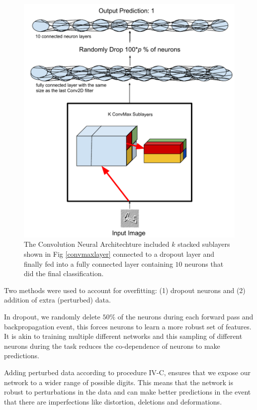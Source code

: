 \documentclass[conference]{IEEEtran}
\begin{document}
\begin{figure}[h]
	\includegraphics[scale=0.5]{architecture.pdf}
	\caption{The Convolution Neural Architechture included $k$ stacked sublayers shown in Fig \ref{convmaxlayer} connected to a dropout layer and finally fed into a fully connected layer containing $10$ neurons that did the final classification.}
	\label{CNNarch}
\end{figure}

Two methods were used to account for overfitting: (1) dropout\cite{dropout} neurons and (2) addition of extra (perturbed) data. 

In dropout, we randomly delete $50\%$ of the neurons during each forward pass and backpropagation event, this forces neurons to learn a more robust set of features. It is akin to training multiple different networks and this sampling of different neurons during the task reduces the co-dependence of neurons to make predictions. 

Adding perturbed data according to procedure IV-C, ensures that we expose our network to a wider range of possible digits. This means that the network is robust to perturbations in the data and can make better predictions in the event that there are imperfections like distortion, deletions and deformations.
\end{document}
